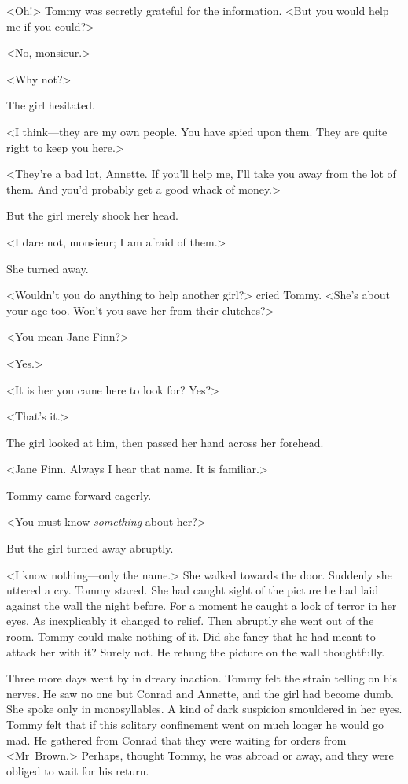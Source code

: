 <Oh!> Tommy was secretly grateful for the information. <But you would help me if you could?>

<No, monsieur.>

<Why not?>

The girl hesitated.

<I think—they are my own people. You have spied upon them. They are quite right to keep you here.>

<They're a bad lot, Annette. If you'll help me, I'll take you away from the lot of them. And you'd probably get a good whack of money.>

But the girl merely shook her head.

<I dare not, monsieur; I am afraid of them.>

She turned away.

<Wouldn't you do anything to help another girl?> cried Tommy. <She's about your age too. Won't you save her from their clutches?>

<You mean Jane Finn?>

<Yes.>

<It is her you came here to look for? Yes?>

<That's it.>

The girl looked at him, then passed her hand across her forehead.

<Jane Finn. Always I hear that name. It is familiar.>

Tommy came forward eagerly.

<You must know \emph{something} about her?>

But the girl turned away abruptly.

<I know nothing—only the name.> She walked towards the door. Suddenly she uttered a cry. Tommy stared. She had caught sight of the picture he had laid against the wall the night before. For a moment he caught a look of terror in her eyes. As inexplicably it changed to relief. Then abruptly she went out of the room. Tommy could make nothing of it. Did she fancy that he had meant to attack her with it? Surely not. He rehung the picture on the wall thoughtfully.

Three more days went by in dreary inaction. Tommy felt the strain telling on his nerves. He saw no one but Conrad and Annette, and the girl had become dumb. She spoke only in monosyllables. A kind of dark suspicion smouldered in her eyes. Tommy felt that if this solitary confinement went on much longer he would go mad. He gathered from Conrad that they were waiting for orders from <Mr~Brown.> Perhaps, thought Tommy, he was abroad or away, and they were obliged to wait for his return.

